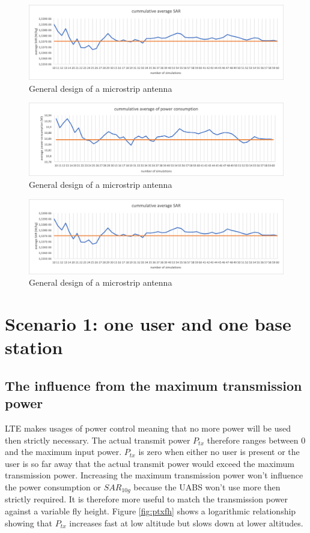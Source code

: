 \begin{figure}[th!]
  \includegraphics[width=\textwidth]{../results/numberOfSim/sarvssim.png}
  \caption{General design of a microstrip antenna}
  \label{fig:fhsar}
\end{figure}
\begin{figure}[th!]
  \includegraphics[width=\textwidth]{../results/numberOfSim/pcvssim.png}
  \caption{General design of a microstrip antenna}
  \label{fig:fhsar}
\end{figure}
\begin{figure}[th!]
  \includegraphics[width=\textwidth]{../results/numberOfSim/sarvssim.png}
  \caption{General design of a microstrip antenna}
  \label{fig:fhsar}
\end{figure}

\section{Scenario 1: one user and one base station}

\subsection{The influence from the maximum transmission power}
\gls{LTE} makes usages of power control meaning that no more power will be used then strictly necessary. The actual 
transmit power $P_{tx}$ therefore ranges between 0 and the maximum input power. $P_{tx}$ is zero when either no user is 
present or the user is so far away that the actual transmit power would exceed the maximum transmission power.
Increasing the maximum transmission power won't influence the power consumption or $SAR_{10g}$ because the \gls{UABS} won't use more
then strictly required. It is therefore more useful to match the transmission power against a variable fly height. Figure \ref{fig:ptxfh}
shows a logarithmic  relationship showing that $P_{tx}$ increases fast at low altitude but slows down at lower altitudes. 

